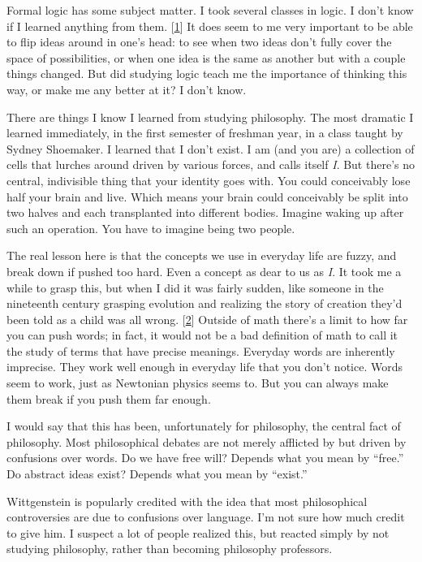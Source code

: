 Formal logic has some subject matter. I took several classes in logic. I
don't know if I learned anything from them. {[}\hyperref[f1n]{1}{]} It
does seem to me very important to be able to flip ideas around in one's
head: to see when two ideas don't fully cover the space of
possibilities, or when one idea is the same as another but with a couple
things changed. But did studying logic teach me the importance of
thinking this way, or make me any better at it? I don't know.

There are things I know I learned from studying philosophy. The most
dramatic I learned immediately, in the first semester of freshman year,
in a class taught by Sydney Shoemaker. I learned that I don't exist. I
am (and you are) a collection of cells that lurches around driven by
various forces, and calls itself \emph{I}. But there's no central,
indivisible thing that your identity goes with. You could conceivably
lose half your brain and live. Which means your brain could conceivably
be split into two halves and each transplanted into different bodies.
Imagine waking up after such an operation. You have to imagine being two
people.

The real lesson here is that the concepts we use in everyday life are
fuzzy, and break down if pushed too hard. Even a concept as dear to us
as \emph{I}. It took me a while to grasp this, but when I did it was
fairly sudden, like someone in the nineteenth century grasping evolution
and realizing the story of creation they'd been told as a child was all
wrong. {[}\hyperref[f2n]{2}{]} Outside of math there's a limit to how
far you can push words; in fact, it would not be a bad definition of
math to call it the study of terms that have precise meanings. Everyday
words are inherently imprecise. They work well enough in everyday life
that you don't notice. Words seem to work, just as Newtonian physics
seems to. But you can always make them break if you push them far
enough.

I would say that this has been, unfortunately for philosophy, the
central fact of philosophy. Most philosophical debates are not merely
afflicted by but driven by confusions over words. Do we have free will?
Depends what you mean by ``free.'' Do abstract ideas exist? Depends what
you mean by ``exist.''

Wittgenstein is popularly credited with the idea that most philosophical
controversies are due to confusions over language. I'm not sure how much
credit to give him. I suspect a lot of people realized this, but reacted
simply by not studying philosophy, rather than becoming philosophy
professors.

